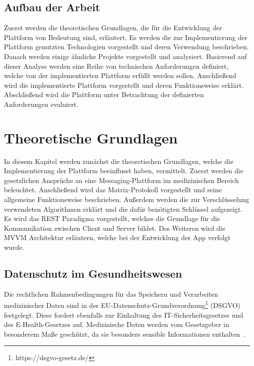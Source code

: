     \section{Aufbau der Arbeit}\label{sec:aufbau-der-arbeit}
    Zuerst werden die theoretischen Grundlagen, die für die Entwicklung der Plattform von Bedeutung sind, erläutert.
    Es werden die zur Implementierung der Plattform genutzten Technologien vorgestellt und deren Verwendung beschrieben.
    Danach werden einige ähnliche Projekte vorgestellt und analysiert.
    Basierend auf dieser Analyse werden eine Reihe von technischen Anforderungen definiert, welche von der implementierten Plattform erfüllt werden sollen.
    Anschließend wird die implementierte Plattform vorgestellt und deren Funktionsweise erklärt.
    Abschließend wird die Plattform unter Betrachtung der definierten Anforderungen evaluiert.

    \newpage
    \chapter{Theoretische Grundlagen}\label{ch:theoretische-grundlagen}
    In diesem Kapitel werden zunächst die theoretischen Grundlagen, welche die Implementierung der Plattform beeinflusst haben, vermittelt.
    Zuerst werden die gesetzlichen Ansprüche an eine Messaging-Plattform im medizinischen Bereich beleuchtet.
    Anschließend wird das Matrix-Protokoll vorgestellt und seine allgemeine Funktionsweise beschrieben.
    Außerdem werden die zur Verschlüsselung verwendeten Algorithmen erklärt und die dafür benötigten Schlüssel aufgezeigt.
    Es wird das REST Paradigma vorgestellt, welches die Grundlage für die Kommunikation zwischen Client und Server bildet.
    Des Weiteren wird die MVVM Architektur erläutern, welche bei der Entwicklung der App verfolgt wurde.

    \section{Datenschutz im Gesundheitswesen}\label{sec:datenschutz-im-gesundheitswesen}
    Die rechtlichen Rahmenbedingungen für das Speichern und Verarbeiten medizinischer Daten sind in der EU-Datenschutz-Grundverordnung\footnote{https://dsgvo-gesetz.de/} (DSGVO) festgelegt.
    Diese fordert ebenfalls zur Einhaltung des IT-Sicherheitsgesetzes und des E-Health-Gesetzes auf.
    Medizinische Daten werden vom Gesetzgeber in besonderem Maße geschützt, da sie besonders sensible Informationen enthalten~\cite{datenschutzimgesundeitswesen}.

